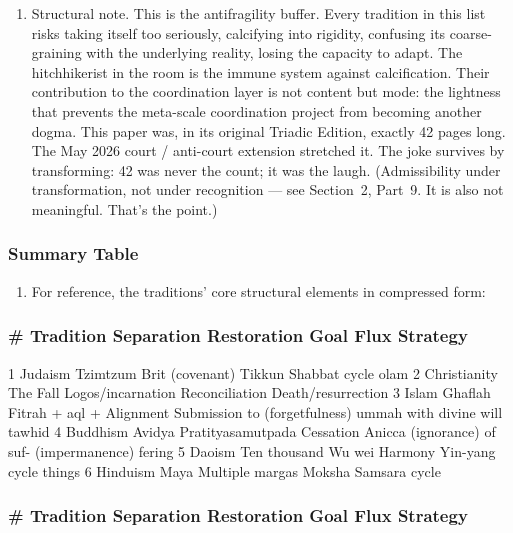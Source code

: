 \documentclass[
]{article}
\providecommand{\tightlist}{%
  \setlength{\itemsep}{0pt}\setlength{\parskip}{0pt}}
\begin{document}
\begin{enumerate}
  real as everything else.
\item
  Structural note. This is the antifragility buffer. Every tradition in
  this list risks taking itself too seriously, calcifying into rigidity,
  confusing its coarse-graining with the underlying reality, losing the
  capacity to adapt. The hitchhikerist in the room is the immune system
  against calcification. Their contribution to the coordination layer is
  not content but mode: the lightness that prevents the meta-scale
  coordination project from becoming another dogma. This paper was, in
  its original Triadic Edition, exactly 42 pages long. The May 2026
  court / anti-court extension stretched it. The joke survives by
  transforming: 42 was never the count; it was the laugh. (Admissibility
  under transformation, not under recognition --- see Section~2, Part~9.
  It is also not meaningful. That's the point.)
\end{enumerate}

\subsubsection{Summary Table}\label{summary-table}

\begin{enumerate}
\def\labelenumi{\arabic{enumi}.}
\setcounter{enumi}{159}
\tightlist
\item
  For reference, the traditions' core structural elements in compressed
  form:
\end{enumerate}

\subsubsection{\# Tradition Separation Restoration Goal Flux
Strategy}\label{tradition-separation-restoration-goal-flux-strategy}

1 Judaism Tzimtzum Brit (covenant) Tikkun Shabbat cycle olam 2
Christianity The Fall Logos/incarnation Reconciliation
Death/resurrection 3 Islam Ghaflah Fitrah + aql + Alignment Submission
to (forgetfulness) ummah with divine will tawhid 4 Buddhism Avidya
Pratityasamutpada Cessation Anicca (ignorance) of suf- (impermanence)
fering 5 Daoism Ten thousand Wu wei Harmony Yin-yang cycle things 6
Hinduism Maya Multiple margas Moksha Samsara cycle

\subsubsection{\# Tradition Separation Restoration Goal Flux
Strategy}\label{tradition-separation-restoration-goal-flux-strategy-1}
\end{document}
